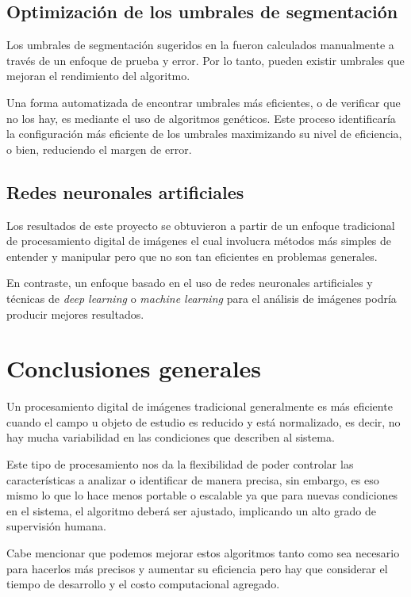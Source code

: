 \subsection{Optimización de los umbrales de segmentación}
Los umbrales de segmentación sugeridos en la  fueron calculados manualmente a través de un enfoque de prueba y error. Por lo tanto, pueden existir umbrales que mejoran el rendimiento del algoritmo.

Una forma automatizada de encontrar umbrales más eficientes, o de verificar que no los hay, es mediante el uso de algoritmos genéticos. Este proceso identificaría la configuración más eficiente de los umbrales maximizando su nivel de eficiencia, o bien, reduciendo el margen de error.

\subsection{Redes neuronales artificiales}
Los resultados de este proyecto se obtuvieron a partir de un enfoque tradicional de procesamiento digital de imágenes el cual involucra métodos más simples de entender y manipular pero que no son tan eficientes en problemas generales.

En contraste, un enfoque basado en el uso de redes neuronales artificiales y técnicas de \textit{deep learning} o \textit{machine learning} para el análisis de imágenes podría producir mejores resultados.

\section{Conclusiones generales}
Un procesamiento digital de imágenes tradicional generalmente es más eficiente cuando el campo u objeto de estudio es reducido y está normalizado, es decir, no hay mucha variabilidad en las condiciones que describen al sistema.

Este tipo de procesamiento nos da la flexibilidad de poder controlar las características a analizar o identificar de manera precisa, sin embargo, es eso mismo lo que lo hace menos portable o escalable ya que para nuevas condiciones en el sistema, el algoritmo deberá ser ajustado, implicando un alto grado de supervisión humana.

Cabe mencionar que podemos mejorar estos algoritmos tanto como sea necesario para hacerlos más precisos y aumentar su eficiencia pero hay que considerar el tiempo de desarrollo y el costo computacional agregado.